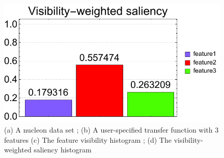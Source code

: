 \begin{figure}
\begin{minipage}{.29\textwidth}
	\subcaption{}
\end{minipage}~
\begin{minipage}{.29\textwidth}
	\includegraphics[width=1\linewidth]{figures/nucleon_naive_proportional_visibility_saliency_weighted_chart}
	\subcaption{}
\end{minipage}
\caption[A nucleon data set]{(a) A nucleon data set \cite{website:Voreen_datasets_2013}; (b) A user-specified transfer function with 3 features (c) The feature visibility histogram \cite{wang_efficient_2011}; (d) The visibility-weighted saliency histogram}
\label{fig:nucleon_naive}
\end{figure}

